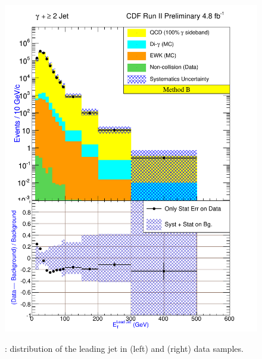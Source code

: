\documentclass[11pt]{article}
\begin{document}
\begin{figure}[h!]
{ \includegraphics[scale=\resultsHistScale,keepaspectratio=true]{./g30jet_MtdB_plot2_Et_j1.pdf}
}
 \caption{: \et distribution of the leading jet in \phoonejet (left) and \photwojet (right) data samples.}
 \label{fig:Result_MtdB_gj1_JetEt}
\end{figure}
\end{document}
